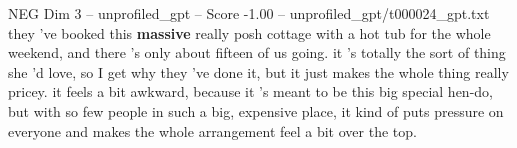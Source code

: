 \begin{textsample}{NEG Dim 3 – unprofiled\_gpt – Score -1.00 – unprofiled\_gpt/t000024\_gpt.txt}  \label{ex:f3_neg_012}
they 've booked this \textbf{massive} really posh cottage with a hot tub for the whole weekend, and there ’s only about fifteen of us going. it ’s totally the sort of thing she ’d love, so I get why they ’ve done it, but it just makes the whole thing really pricey. it feels a bit awkward, because it ’s meant to be this big special hen-do, but with so few people in such a big, expensive place, it kind of puts pressure on everyone and makes the whole arrangement feel a bit over the top.

\end{textsample}
